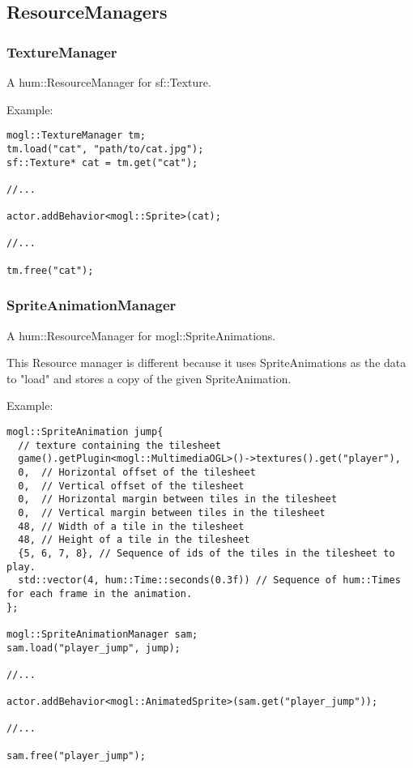 \subsection{ResourceManagers}

\subsubsection{TextureManager}

A hum::ResourceManager for sf::Texture.

Example:
\begin{lstlisting}[caption=TextureManager example]
mogl::TextureManager tm;
tm.load("cat", "path/to/cat.jpg");
sf::Texture* cat = tm.get("cat");

//...

actor.addBehavior<mogl::Sprite>(cat);

//...

tm.free("cat");
\end{lstlisting}

\subsubsection{SpriteAnimationManager}

A hum::ResourceManager for mogl::SpriteAnimations.

This Resource manager is different because it uses SpriteAnimations as the
data to "load" and stores a copy of the given SpriteAnimation.

Example:
\begin{lstlisting}[caption=SpriteAnimationManager example, label=lst:spriteAnimationManager]
mogl::SpriteAnimation jump{
  // texture containing the tilesheet
  game().getPlugin<mogl::MultimediaOGL>()->textures().get("player"),
  0,  // Horizontal offset of the tilesheet
  0,  // Vertical offset of the tilesheet
  0,  // Horizontal margin between tiles in the tilesheet
  0,  // Vertical margin between tiles in the tilesheet
  48, // Width of a tile in the tilesheet
  48, // Height of a tile in the tilesheet
  {5, 6, 7, 8}, // Sequence of ids of the tiles in the tilesheet to play.
  std::vector(4, hum::Time::seconds(0.3f)) // Sequence of hum::Times for each frame in the animation.
};

mogl::SpriteAnimationManager sam;
sam.load("player_jump", jump);

//...

actor.addBehavior<mogl::AnimatedSprite>(sam.get("player_jump"));

//...

sam.free("player_jump");
\end{lstlisting}


